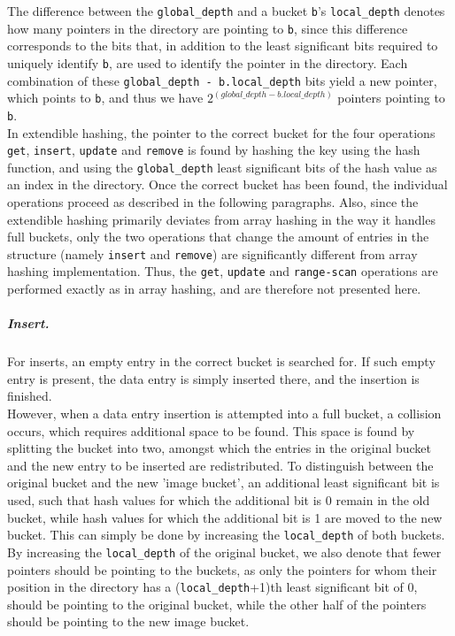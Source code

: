 \documentclass[11pt]{article} %
\begin{document}
The difference between the \verb|global_depth| and a bucket \verb|b|'s \verb|local_depth| denotes how many pointers in the directory are pointing to \verb|b|, since this difference corresponds to the bits that, in addition to the least significant bits required to uniquely identify \verb|b|, are used to identify the pointer in the directory. Each combination of these \verb|global_depth - b.local_depth| bits yield a new pointer, which points to \verb|b|, and thus we have $2^{(global\_depth-b.local\_depth)}$ pointers pointing to \verb|b|.\\

In extendible hashing, the pointer to the correct bucket for the four operations \verb|get|, \verb|insert|, \verb|update| and \verb|remove| is found by hashing the key using the hash function, and using the \verb|global_depth| least significant bits of the hash value as an index in the directory. Once the correct bucket has been found, the individual operations proceed as described in the following paragraphs. Also, since the extendible hashing primarily deviates from array hashing in the way it handles full buckets, only the two operations that change the amount of entries in the structure (namely \verb|insert| and \verb|remove|) are significantly different from array hashing implementation. Thus, the \verb|get|, \verb|update| and \verb|range-scan| operations are performed exactly as in array hashing, and are therefore not presented here.

\subparagraph{Insert.} For inserts, an empty entry in the correct bucket is searched for. If such empty entry is present, the data entry is simply inserted there, and the insertion is finished. \\

However, when a data entry insertion is attempted into a full bucket, a collision occurs, which requires additional space to be found. This space is found by splitting the bucket into two, amongst which the entries in the original bucket and the new entry to be inserted are redistributed. To distinguish between the original bucket and the new 'image bucket', an additional least significant bit is used, such that hash values for which the additional bit is 0 remain in the old bucket, while hash values for which the additional bit is 1 are moved to the new bucket. This can simply be done by increasing the \verb|local_depth| of both buckets. By increasing the \verb|local_depth| of the original bucket, we also denote that fewer pointers should be pointing to the buckets, as only the pointers for whom their position in the directory has a (\verb|local_depth|+1)th least significant bit of 0, should be pointing to the original bucket, while the other half of the pointers should be pointing to the new image bucket.
\end{document}
